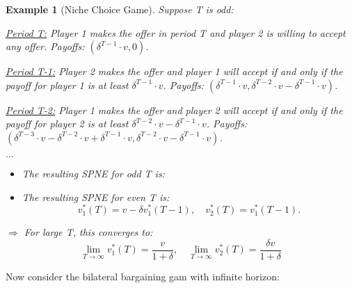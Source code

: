 \documentclass[12pt]{extreport} %
\theoremstyle{named}
\theoremstyle{itshape}
\theoremstyle{normal}
\newtheorem{example}[unnamedtheorem]{Example}
\begin{document}
\begin{example}[Niche Choice Game]
  Suppose T is odd:
  \begin{description}
  	\item \underline{Period T:} Player 1 makes the offer in period T and player 2 is willing to accept any offer. Payoffs: $(\delta^{T-1} \cdot v, 0)$.
  	\item \underline{Period T-1:} Player 2 makes the offer and player 1 will accept if and only if the payoff for player 1 is at least $\delta^{T-1} \cdot v$. Payoffs: $(\delta^{T-1} \cdot v, \delta^{T-2} \cdot v - \delta^{T-1} \cdot v)$.
  	\item \underline{Period T-2:} Player 1 makes the offer and player 2 will accept if and only if the payoff for player 2 is at least $\delta^{T-2} \cdot v - \delta^{T-1} \cdot v$. Payoffs: $(\delta^{T-3} \cdot v - \delta^{T-2} \cdot v + \delta^{T-1} \cdot v, \delta^{T-2} \cdot v - \delta^{T-1} \cdot v)$.
  	\item $\dotsc$
  \end{description}  
  \begin{itemize}
  	\item  The resulting SPNE for odd T is:
	\item The resulting SPNE for even T is:
		$$ v_1^*(T) = v - \delta v_1^*(T-1), \quad v_2^*(T) = v_1^*(T - 1). $$
  \end{itemize}
  $\Rightarrow$ For large T, this converges to:
 	$$ \lim_{T \rightarrow \infty} v_1^*(T) = \frac{v}{1 + \delta}, \quad \lim_{T \rightarrow \infty} v_2^*(T) = \frac{\delta v}{1 + \delta}$$
\end{example} 

Now consider the bilateral bargaining gam with infinite horizon:
\end{document}
